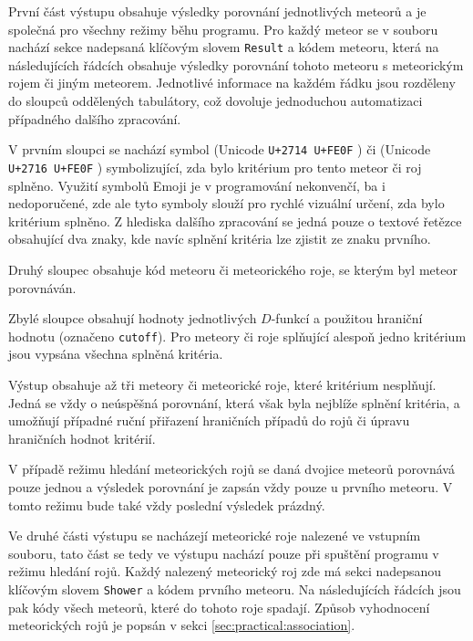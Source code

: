 \medskip

První část výstupu obsahuje výsledky porovnání jednotlivých meteorů a je společná pro všechny režimy běhu programu. Pro každý meteor se v souboru nachází sekce nadepsaná klíčovým slovem \texttt{Result} a kódem meteoru, která na následujících řádcích obsahuje výsledky porovnání tohoto meteoru s meteorickým rojem či jiným meteorem. Jednotlivé informace na každém řádku jsou rozděleny do sloupců oddělených tabulátory, což dovoluje jednoduchou automatizaci případného dalšího zpracování.

V prvním sloupci se nachází symbol \eCheck\hspace{4pt}(Unicode \texttt{U+2714 U+FE0F} \cite{unicode}) či \eCross\hspace{4pt}(Unicode \texttt{U+2716 U+FE0F} \cite{unicode}) symbolizující, zda bylo kritérium pro tento meteor či roj splněno. Využití symbolů Emoji je v programování nekonvenčí, ba i nedoporučené, zde ale tyto symboly slouží pro rychlé vizuální určení, zda bylo kritérium splněno. Z hlediska dalšího zpracování se jedná pouze o textové řetězce obsahující dva znaky, kde navíc splnění kritéria lze zjistit ze znaku prvního.

Druhý sloupec obsahuje kód meteoru či meteorického roje, se kterým byl meteor porovnáván.

Zbylé sloupce obsahují hodnoty jednotlivých $D$-funkcí a použitou hraniční hodnotu (označeno \texttt{cutoff}). Pro meteory či roje splňující alespoň jedno kritérium jsou vypsána všechna splněná kritéria.

\smallskip

Výstup obsahuje až tři meteory či meteorické roje, které kritérium nesplňují. Jedná se vždy o neúspěšná porovnání, která však byla nejblíže splnění kritéria, a umožňují případné ruční přiřazení hraničních případů do rojů či úpravu hraničních hodnot kritérií.

V případě režimu hledání meteorických rojů se daná dvojice meteorů porovnává pouze jednou a výsledek porovnání je zapsán vždy pouze u prvního meteoru. V tomto režimu bude také vždy poslední výsledek prázdný.

\medskip

Ve druhé části výstupu se nacházejí meteorické roje nalezené ve vstupním souboru, tato část se tedy ve výstupu nachází pouze při spuštění programu v režimu hledání rojů. Každý nalezený meteorický roj zde má sekci nadepsanou klíčovým slovem \texttt{Shower} a kódem prvního meteoru. Na následujících řádcích jsou pak kódy všech meteorů, které do tohoto roje spadají. Způsob vyhodnocení meteorických rojů je popsán v sekci \ref{sec:practical:association}.

